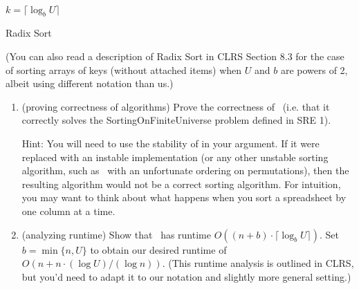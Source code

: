 \documentclass[11pt]{article}
\begin{document}
\begin{enumerate}
\begin{algorithm}[H]
\\
$k=\lceil \log_b U\rceil$\;
\caption{Radix Sort}
\end{algorithm}

(You can also read a description of Radix Sort in CLRS Section 8.3 for the case of sorting arrays of keys (without attached items) when $U$ and $b$ are powers of 2, albeit using different notation than us.)

        \begin{enumerate}
        
            \item (proving correctness of algorithms) Prove the correctness of \RadixSort\ (i.e. that it correctly solves the SortingOnFiniteUniverse problem defined in SRE 1). 
            
            Hint: You will need to use the stability of \SingletonBucketSort in your argument. If it were replaced with an instable implementation (or any other unstable sorting algorithm, such as \ExhaustiveSearchSort\ with an unfortunate ordering on permutations), then the resulting algorithm would not be a correct sorting algorithm.   For intuition, you may want to think about what happens when you sort a spreadsheet by one column at a time. 

          
            
     

          
            
           
            
            \item (analyzing runtime) Show that \RadixSort\ has runtime $O((n+b)\cdot \lceil \log_b U\rceil)$.  Set $b=\min\{n,U\}$ to obtain our desired runtime of $O(n+n\cdot (\log U)/(\log n))$.  (This runtime analysis is outlined in CLRS, but you'd need to adapt it to our notation and slightly more general setting.) 




\end{enumerate}
\end{enumerate}
\end{document}
